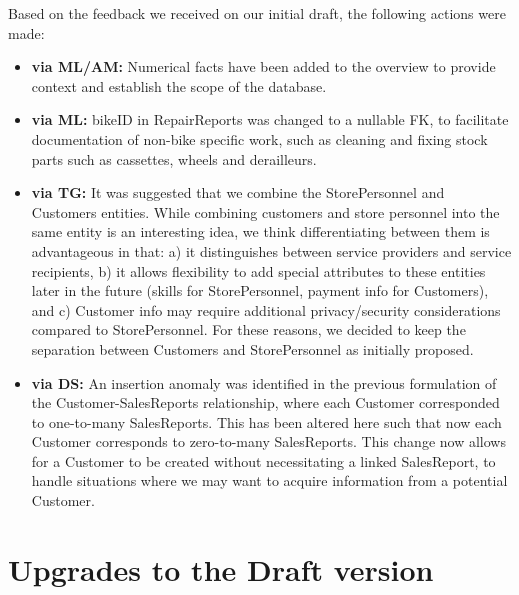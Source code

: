 \documentclass{article}
\begin{document}
\begin{tcolorbox}[colback=secondarycolor, colframe=primarycolor, arc=5mm]
Based on the feedback we received on our initial draft, the following actions were made:
\begin{itemize}
  \item \textbf{via ML/AM:} Numerical facts have been added to the overview to provide context and establish the scope of the database.
  \item \textbf{via ML:} bikeID in RepairReports was changed to a nullable FK, to facilitate documentation of non-bike specific work, such as cleaning and fixing stock parts such as cassettes, wheels and derailleurs.
  \item \textbf{via TG:} It was suggested that we combine the StorePersonnel and Customers entities. While combining customers and store personnel into the same entity is an interesting idea, we think differentiating between them is advantageous in that: a) it distinguishes between service providers and service recipients, b) it allows flexibility to add special attributes to these entities later in the future (skills for StorePersonnel, payment info for Customers), and c) Customer info may require additional privacy/security considerations compared to StorePersonnel. For these reasons, we decided to keep the separation between Customers and StorePersonnel as initially proposed.
  \item \textbf{via DS:} An insertion anomaly was identified in the previous formulation of the Customer-SalesReports relationship, where each Customer corresponded to one-to-many SalesReports. This has been altered here such that now each Customer corresponds to zero-to-many SalesReports. This change now allows for a Customer to be created without necessitating a linked SalesReport, to handle situations where we may want to acquire information from a potential Customer. 
\end{itemize}
\vspace{0.2cm}

\end{tcolorbox}

\vspace{1cm}

\section{Upgrades to the Draft version}
\end{document}
